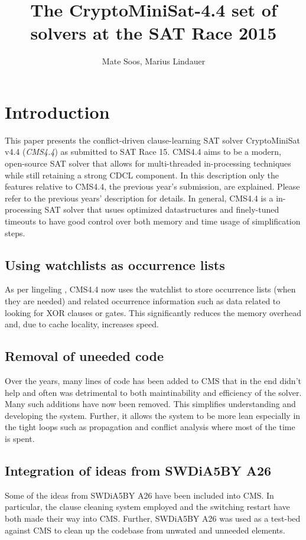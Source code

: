 \documentclass[final]{ieee}
\begin{document}
\title{The CryptoMiniSat-4.4 set of solvers at the SAT Race 2015}
\author{Mate Soos, Marius Lindauer}

\maketitle
\thispagestyle{empty}
\pagestyle{empty}

\section{Introduction}
This paper presents the conflict-driven clause-learning SAT solver CryptoMiniSat v4.4 (\emph{CMS4.4}) as submitted to SAT Race 15. CMS4.4 aims to be a modern, open-source SAT solver that allows for multi-threaded in-processing techniques while still retaining a strong CDCL component. In this description only the features relative to CMS4.4, the previous year's submission, are explained. Please refer to the previous years' description for details. In general, CMS4.4 is a in-processing SAT solver that usues optimized datastructures and finely-tuned timeouts to have good control over both memory and time usage of simplification steps.

\subsection{Using watchlists as occurrence lists}
As per lingeling \cite{lingeling}, CMS4.4 now uses the watchlist to store occurrence lists (when they are needed) and related occurrence information such as data related to looking for XOR clauses or gates. This significantly reduces the memory overhead and, due to cache locality, increases speed.

\subsection{Removal of uneeded code}
Over the years, many lines of code has been added to CMS that in the end didn't help and often was detrimental to both maintinability and efficiency of the solver. Many such additions have now been removed. This simplifies understanding and developing the system. Further, it allows the system to be more lean especially in the tight loops such as propagation and conflict analysis where most of the time is spent.

\subsection{Integration of ideas from SWDiA5BY A26}
Some of the ideas from SWDiA5BY A26\cite{swdia} have been included into CMS. In particular, the clause cleaning system employed and the switching restart have both made their way into CMS. Further, SWDiA5BY A26 was used as a test-bed against CMS to clean up the codebase from unwated and unneeded elements.
\end{document}
